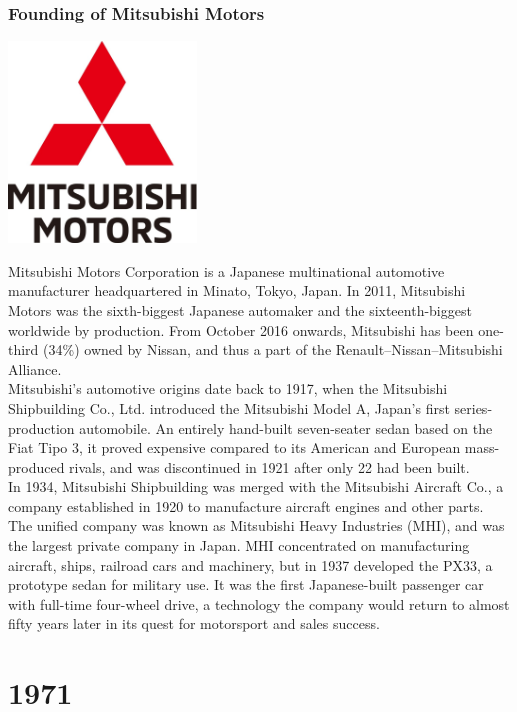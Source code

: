 \documentclass[11pt]{report}
\begin{document}
\subsection{Founding of Mitsubishi Motors}
\vspace{2mm}\begin{center}\includegraphics[width=5cm]{./img/mitsubishiLogo.jpg}\end{center}
Mitsubishi Motors Corporation is a Japanese multinational automotive manufacturer headquartered in Minato, Tokyo, Japan. In 2011, Mitsubishi Motors was the sixth-biggest Japanese automaker and the sixteenth-biggest worldwide by production. From October 2016 onwards, Mitsubishi has been one-third (34\%) owned by Nissan, and thus a part of the Renault–Nissan–Mitsubishi Alliance.\\
\indent Mitsubishi's automotive origins date back to 1917, when the Mitsubishi Shipbuilding Co., Ltd. introduced the Mitsubishi Model A, Japan's first series-production automobile. An entirely hand-built seven-seater sedan based on the Fiat Tipo 3, it proved expensive compared to its American and European mass-produced rivals, and was discontinued in 1921 after only 22 had been built.\\
\indent In 1934, Mitsubishi Shipbuilding was merged with the Mitsubishi Aircraft Co., a company established in 1920 to manufacture aircraft engines and other parts. The unified company was known as Mitsubishi Heavy Industries (MHI), and was the largest private company in Japan. MHI concentrated on manufacturing aircraft, ships, railroad cars and machinery, but in 1937 developed the PX33, a prototype sedan for military use. It was the first Japanese-built passenger car with full-time four-wheel drive, a technology the company would return to almost fifty years later in its quest for motorsport and sales success.

\chapter{1971}
\end{document}
